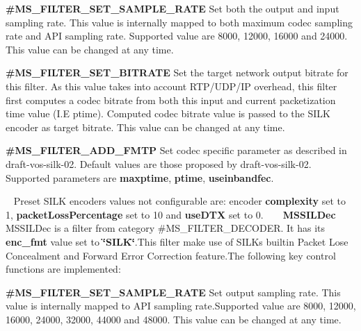 \begin{DoxyItemize}
\item {\bfseries \#\+M\+S\+\_\+\+F\+I\+L\+T\+E\+R\+\_\+\+S\+E\+T\+\_\+\+S\+A\+M\+P\+L\+E\+\_\+\+R\+A\+TE} Set both the output and input sampling rate. This value is internally mapped to both maximum codec sampling rate and A\+PI sampling rate. Supported value are 8000, 12000, 16000 and 24000. This value can be changed at any time. 
\item {\bfseries \#\+M\+S\+\_\+\+F\+I\+L\+T\+E\+R\+\_\+\+S\+E\+T\+\_\+\+B\+I\+T\+R\+A\+TE} Set the target network output bitrate for this filter. As this value takes into account R\+T\+P/\+U\+D\+P/\+IP overhead, this filter first computes a codec bitrate from both this input and current packetization time value (I.\+E ptime). Computed codec bitrate value is passed to the S\+I\+LK encoder as target bitrate. This value can be changed at any time. 
\item {\bfseries \#\+M\+S\+\_\+\+F\+I\+L\+T\+E\+R\+\_\+\+A\+D\+D\+\_\+\+F\+M\+TP} Set codec specific parameter as described in draft-\/vos-\/silk-\/02. Default values are those proposed by draft-\/vos-\/silk-\/02. Supported parameters are {\bfseries maxptime}, {\bfseries ptime}, {\bfseries useinbandfec}. 
\end{DoxyItemize}~\newline
 Preset S\+I\+LK encoder\textquotesingle{}s values not configurable are\+: encoder {\bfseries complexity} set to 1, {\bfseries packet\+Loss\+Percentage} set to 10 and {\bfseries use\+D\+TX} set to 0. ~\newline
~\newline
 {\bfseries  M\+S\+S\+I\+L\+Dec} ~\newline
 M\+S\+S\+I\+L\+Dec is a filter from category \#\+M\+S\+\_\+\+F\+I\+L\+T\+E\+R\+\_\+\+D\+E\+C\+O\+D\+ER. It has its {\bfseries enc\+\_\+fmt} value set to {\bfseries \char`\"{}\+S\+I\+L\+K\char`\"{}}.This filter make use of S\+I\+LK\textquotesingle{}s builtin Packet Lose Concealment and Forward Error Correction feature.\+The following key control functions are implemented\+: ~\newline
 
\begin{DoxyItemize}
\item {\bfseries \#\+M\+S\+\_\+\+F\+I\+L\+T\+E\+R\+\_\+\+S\+E\+T\+\_\+\+S\+A\+M\+P\+L\+E\+\_\+\+R\+A\+TE} Set output sampling rate. This value is internally mapped to A\+PI sampling rate.\+Supported value are 8000, 12000, 16000, 24000, 32000, 44000 and 48000. This value can be changed at any time. 
\end{DoxyItemize}~\newline
 